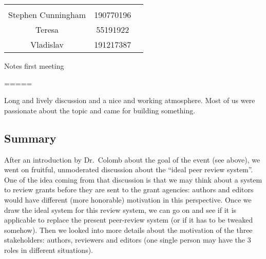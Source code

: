 \documentclass[]{article}
\begin{document}
\begin{longtable}[c]{@{}ccc@{}}
\begin{minipage}[t]{0.13\columnwidth}\centering\strut
\strut\end{minipage}\tabularnewline
\begin{minipage}[t]{0.24\columnwidth}\centering\strut
Stephen Cunningham
\strut\end{minipage} &
\begin{minipage}[t]{0.13\columnwidth}\centering\strut
190770196
\strut\end{minipage} &
\begin{minipage}[t]{0.13\columnwidth}\centering\strut
\strut\end{minipage}\tabularnewline
\begin{minipage}[t]{0.24\columnwidth}\centering\strut
Teresa
\strut\end{minipage} &
\begin{minipage}[t]{0.13\columnwidth}\centering\strut
55191922
\strut\end{minipage} &
\begin{minipage}[t]{0.13\columnwidth}\centering\strut
\strut\end{minipage}\tabularnewline
\begin{minipage}[t]{0.24\columnwidth}\centering\strut
Vladislav
\strut\end{minipage} &
\begin{minipage}[t]{0.13\columnwidth}\centering\strut
191217387
\strut\end{minipage} &
\begin{minipage}[t]{0.13\columnwidth}\centering\strut
\strut\end{minipage}\tabularnewline
\bottomrule
\end{longtable}

Notes first meeting

=====

Long and lively discussion and a nice and working atmosphere. Most of us
were passionate about the topic and came for building something.

\subsection{Summary}\label{summary}

After an introduction by Dr.~Colomb about the goal of the event (see
above), we went on fruitful, unmoderated discussion about the ``ideal
peer review system''. One of the idea coming from that discussion is
that we may think about a system to review grants before they are sent
to the grant agencies: authors and editors would have different (more
honorable) motivation in this perspective. Once we draw the ideal system
for this review system, we can go on and see if it is applicable to
replace the present peer-review system (or if it has to be tweaked
somehow). Then we looked into more details about the motivation of the
three stakeholders: authors, reviewers and editors (one single person
may have the 3 roles in different situations).
\end{document}
